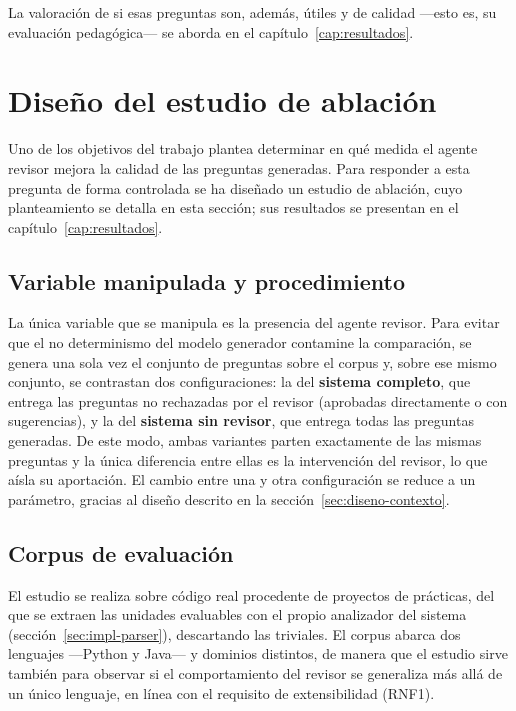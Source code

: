 La valoración de si esas preguntas son, además, útiles y de calidad ---esto es,
su evaluación pedagógica--- se aborda en el capítulo~\ref{cap:resultados}.


\section{Diseño del estudio de ablación}
\label{sec:diseno-ablacion}

Uno de los objetivos del trabajo plantea determinar en qué medida el agente
revisor mejora la calidad de las preguntas generadas. Para responder a esta
pregunta de forma controlada se ha diseñado un estudio de ablación, cuyo
planteamiento se detalla en esta sección; sus resultados se presentan en el
capítulo~\ref{cap:resultados}.

\subsection{Variable manipulada y procedimiento}

La única variable que se manipula es la presencia del agente revisor. Para
evitar que el no determinismo del modelo generador contamine la comparación,
se genera una sola vez el conjunto de preguntas sobre el corpus y, sobre ese
mismo conjunto, se contrastan dos configuraciones: la del \textbf{sistema
completo}, que entrega las preguntas no rechazadas por el revisor (aprobadas
directamente o con sugerencias), y la
del \textbf{sistema sin revisor}, que entrega todas las preguntas generadas.
De este modo, ambas variantes parten exactamente de las mismas preguntas y la
única diferencia entre ellas es la intervención del revisor, lo que aísla su
aportación. El cambio entre una y otra configuración se reduce a un parámetro,
gracias al diseño descrito en la sección~\ref{sec:diseno-contexto}.

\subsection{Corpus de evaluación}

El estudio se realiza sobre código real procedente de proyectos de prácticas,
del que se extraen las unidades evaluables con el propio analizador del sistema
(sección~\ref{sec:impl-parser}), descartando las triviales. El corpus abarca
dos lenguajes ---Python y Java--- y dominios distintos, de manera que el
estudio sirve también para observar si el comportamiento del revisor se
generaliza más allá de un único lenguaje, en línea con el requisito de
extensibilidad (RNF1).

